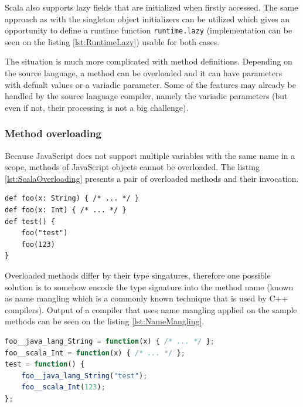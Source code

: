 \documentclass[12pt,a4paper]{report}
\begin{document}
Scala also supports lazy fields that are initialized when firstly accessed. The same approach as with the singleton object initializers can be utilized which gives an opportunity to define a runtime function \texttt{runtime.lazy} (implementation can be seen on the listing \ref{lst:RuntimeLazy}) usable for both cases.

The situation is much more complicated with method definitions. Depending on the source language, a method can be overloaded and it can have parameters with defualt values or a variadic parameter. Some of the features may already be handled by the source language compiler, namely the variadic parameters (but even if not, their processing is not a big challenge).

\subsubsection*{Method overloading}

Because JavaScript does not support multiple variables with the same name in a scope, methods of JavaScript objects cannot be overloaded. The listing \ref{lst:ScalaOverloading} presents a pair of overloaded methods and their invocation.

\begin{minipage}{\linewidth}
\begin{lstlisting}[caption={Scala method overloading example.},label={lst:ScalaOverloading}]
def foo(x: String) { /* ... */ }
def foo(x: Int) { /* ... */ }
def test() {
	foo("test")
	foo(123)
}
\end{lstlisting}
\end{minipage}

Overloaded methods differ by their type singatures, therefore one possible solution is to somehow encode the type signature into the method name (known as name mangling which is a commonly known technique that is used by C++ compilers). Output of a compiler that uses name mangling applied on the sample methods can be seen on the listing \ref{lst:NameMangling}.

\begin{minipage}{\linewidth}
\begin{lstlisting}[language=JavaScript,caption={Overloading solved by name mangling.},label={lst:NameMangling}]
foo__java_lang_String = function(x) { /* ... */ };
foo__scala_Int = function(x) { /* ... */ };
test = function() {
	foo__java_lang_String("test");
	foo__scala_Int(123);
};
\end{lstlisting}
\end{minipage}
\end{document}
